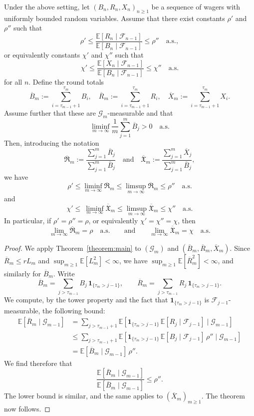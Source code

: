 \documentclass[10pt,a4paper]{amsart}
\newcommand{\E}{\mathbb{E}}
\newcommand{\F}{\mathscr{F}}
\newcommand{\G}{\mathscr{G}}
\begin{document}
\begin{theorem}\label{thm:round}
Under the above setting, let $(B_n,R_n,X_n)_{n\ge1}$ be a sequence of wagers with uniformly bounded random variables.  
Assume that there exist constants $\rho'$ and $\rho''$ such that
\[
\rho' \le \frac{\E[R_n\mid\F_{n-1}]}{\E[B_n\mid\F_{n-1}]} \le \rho'' \quad \text{a.s.},
\]
or equivalently constants $\chi'$ and $\chi''$ such that
\[
\chi' \le \frac{\E[X_n\mid\F_{n-1}]}{\E[B_n\mid\F_{n-1}]} \le \chi'' \quad \text{a.s.}
\]
for all $n$.
Define the round totals
\[
\overline{B}_m:=\sum_{i=\tau_{m-1}+1}^{\tau_m} B_i,\quad
\overline{R}_m:=\sum_{i=\tau_{m-1}+1}^{\tau_m} R_i,\quad
\overline{X}_m:=\sum_{i=\tau_{m-1}+1}^{\tau_m} X_i.
\]
Assume further that these are $\G_m$-measurable and that
\[
\liminf_{m\to\infty} \frac{1}{m}\sum_{j=1}^m \overline{B}_j > 0 \quad \text{a.s.}
\]
Then, introducing the notation
\[
\overline{\mathfrak{R}}_m:=\frac{\sum_{j=1}^m \overline{R}_j}{\sum_{j=1}^m \overline{B}_j}\quad\text{and}\quad
\overline{\mathfrak{X}}_m:=\frac{\sum_{j=1}^m \overline{X}_j}{\sum_{j=1}^m \overline{B}_j},
\]
we have
\[
\rho' \le \liminf_{m\to\infty} \overline{\mathfrak{R}}_m
\le \limsup_{m\to\infty} \overline{\mathfrak{R}}_m
\le \rho''\quad \text{a.s.}
\]
and 
\[
\chi'  \le\ \liminf_{m\to\infty} \overline{\mathfrak{X}}_m
\le \limsup_{m\to\infty} \overline{\mathfrak{X}}_m
\le \chi''\quad \text{a.s.}
\]
In particular, if $\rho'=\rho''=\rho$, or equivalently $\chi'=\chi''=\chi$, then
\[
\lim_{m\to\infty}\overline{\mathfrak{R}}_m = \rho \quad \text{a.s.} \qquad \text{and}
\qquad
\lim_{m\to\infty} \overline{\mathfrak{X}}_m = \chi
\quad \text{a.s.}
\]
\end{theorem}

\begin{proof}
We apply Theorem~\ref{theorem:main} to $(\G_m)$ and $(\overline{B}_m,\overline{R}_m,\overline{X}_m)$.  
Since $\overline{R}_m\le rL_m$ and $\sup_{m\ge1}\E[L_m^2]<\infty$, we have $\sup_{m\ge1}\E[\overline{R}_m^2]<\infty$, and similarly for $\overline{B}_m$.  
Write
\[
\overline{B}_m=\sum_{j>\tau_{m-1}} B_j\,\mathbf 1_{\{\tau_m>j-1\}}, \qquad \overline{R}_m=\sum_{j>\tau_{m-1}} R_j\,\mathbf 1_{\{\tau_m>j-1\}}.
\]
We compute, by the tower property and the fact that $\mathbf 1_{\{\tau_m>j-1\}}$ is $\F_{j-1}$-measurable, the following bound:
\begin{align*}
    \E[\overline{R}_m\mid \G_{m-1}]
    &=\sum_{j > \tau_{m-1}+1}\E[\mathbf 1_{\{\tau_m>j-1\}}\,\E[R_j\mid\F_{j-1}]\mid \G_{m-1}]\\
    &\le \sum_{j > \tau_{m-1}+1}\E[\mathbf 1_{\{\tau_m>j-1\}}\,\E[B_j\mid\F_{j-1}]\, \rho''\mid \G_{m-1}]\\
    &=\E[\overline{B}_m\mid \G_{m-1}]\, \rho''.
\end{align*}
We find therefore that
\[
\frac{\E[\overline{R}_m\mid\G_{m-1}]}{\E[\overline{B}_m\mid\G_{m-1}]} \le \rho''.
\]
The lower bound is similar, and the same applies to $(\overline{X}_m)_{m\ge 1}$.  
The theorem now follows.
\end{proof}
\end{document}
